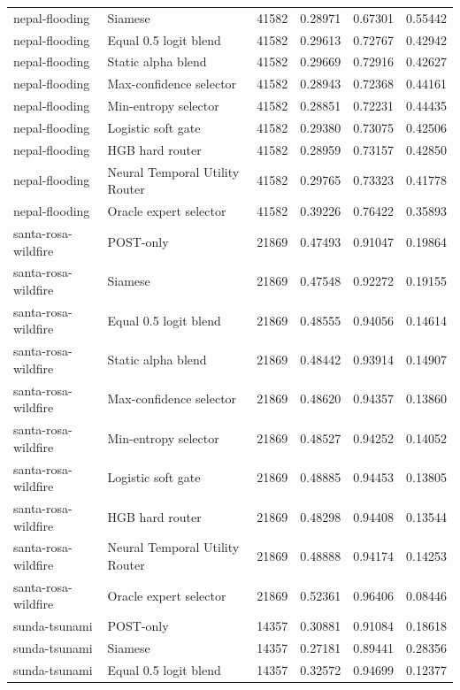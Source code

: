 \begin{tabular}{llrrrr}
nepal-flooding & Siamese & 41582 & 0.28971 & 0.67301 & 0.55442 \\
nepal-flooding & Equal 0.5 logit blend & 41582 & 0.29613 & 0.72767 & 0.42942 \\
nepal-flooding & Static alpha blend & 41582 & 0.29669 & 0.72916 & 0.42627 \\
nepal-flooding & Max-confidence selector & 41582 & 0.28943 & 0.72368 & 0.44161 \\
nepal-flooding & Min-entropy selector & 41582 & 0.28851 & 0.72231 & 0.44435 \\
nepal-flooding & Logistic soft gate & 41582 & 0.29380 & 0.73075 & 0.42506 \\
nepal-flooding & HGB hard router & 41582 & 0.28959 & 0.73157 & 0.42850 \\
nepal-flooding & Neural Temporal Utility Router & 41582 & 0.29765 & 0.73323 & 0.41778 \\
nepal-flooding & Oracle expert selector & 41582 & 0.39226 & 0.76422 & 0.35893 \\
santa-rosa-wildfire & POST-only & 21869 & 0.47493 & 0.91047 & 0.19864 \\
santa-rosa-wildfire & Siamese & 21869 & 0.47548 & 0.92272 & 0.19155 \\
santa-rosa-wildfire & Equal 0.5 logit blend & 21869 & 0.48555 & 0.94056 & 0.14614 \\
santa-rosa-wildfire & Static alpha blend & 21869 & 0.48442 & 0.93914 & 0.14907 \\
santa-rosa-wildfire & Max-confidence selector & 21869 & 0.48620 & 0.94357 & 0.13860 \\
santa-rosa-wildfire & Min-entropy selector & 21869 & 0.48527 & 0.94252 & 0.14052 \\
santa-rosa-wildfire & Logistic soft gate & 21869 & 0.48885 & 0.94453 & 0.13805 \\
santa-rosa-wildfire & HGB hard router & 21869 & 0.48298 & 0.94408 & 0.13544 \\
santa-rosa-wildfire & Neural Temporal Utility Router & 21869 & 0.48888 & 0.94174 & 0.14253 \\
santa-rosa-wildfire & Oracle expert selector & 21869 & 0.52361 & 0.96406 & 0.08446 \\
sunda-tsunami & POST-only & 14357 & 0.30881 & 0.91084 & 0.18618 \\
sunda-tsunami & Siamese & 14357 & 0.27181 & 0.89441 & 0.28356 \\
sunda-tsunami & Equal 0.5 logit blend & 14357 & 0.32572 & 0.94699 & 0.12377 \\

\end{tabular}
